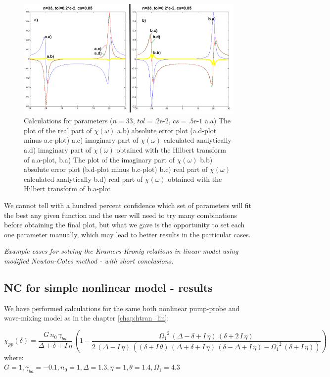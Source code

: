 \documentclass[12pt,twoside,a4paper]{article}
\numberwithin{equation}{subsection}
\numberwithin{figure}{subsection}
\begin{document}
\begin{figure}
  \includegraphics[width=150mm]{img/nc_lin4.png}
  \caption{Calculations for parameters ($n=33, \,tol=\mbox{.2e-2}, \,cs=\mbox{.5e-1}$
    a.a) The plot of the real part of $\chi (\omega )$
    a.b) absolute error plot (a.d-plot minus a.c-plot) 
    a.c) imaginary part of $\chi (\omega )$ calculated analytically 
    a.d) imaginary part of $\chi (\omega )$ obtained with the Hilbert transform of a.a-plot,
    b.a) The plot of the imaginary part of $\chi (\omega )$
    b.b) absolute error plot (b.d-plot minus b.c-plot) 
    b.c) real part of $\chi (\omega )$ calculated analytically 
    b.d) real part of $\chi (\omega )$ obtained with the Hilbert transform of b.a-plot
    \label{fig:nc_lin4} 
    }
\end{figure}

We cannot tell with a hundred percent confidence which set of parameters will fit the best any given function and the user will
need to try many combinations before obtaining the final plot, but what we gave is the opportunity to set each one parameter manually,
which may lead to better results in the particular cases.

\textit{Example cases for solving the Kramers-Kronig relations in linear model using modified Newton-Cotes method - with short
conclusions.}

\subsection{NC for simple nonlinear model - results} \label{chap:nc_nlo}

We have performed calculations for the same both nonlinear pump-probe and wave-mixing model as in the chapter \ref{chap:htran_lin}:

\begin{equation} \label{eq:nc_chipp}
  {\chi_{pp}}(\delta ) = \frac {G\,{n_{0}}\,{\gamma_{ba}}}{\Delta  + \delta  + I\,\eta }\, \left(1 - \frac
  {{\Omega_{1}}^{2}\,(\Delta - \delta  + I\,\eta )\,(\delta  + 2\,I\,\eta )}{2\,(\Delta  - I\,\eta )\,((\delta  + I\,\theta
  )\,(\Delta  + \delta  + I\,\eta )\, (\delta  - \Delta  + I\,\eta ) - {\Omega_{1}}^{2}\,(\delta  + I\,\eta ))} \!  \right) 
\end{equation}
where: \\
$G=1, \gamma_{ba} = -0.1, n_{0} = 1, \Delta = 1.3, \eta = 1, \theta = 1.4, \Omega_{1}=4.3$
\end{document}
